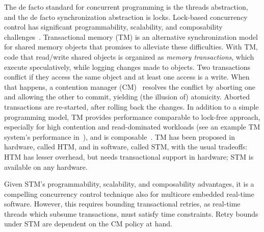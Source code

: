 \documentclass[conference]{IEEEtran}
\begin{document}
The de facto standard for concurrent programming is the threads abstraction, and the 
de facto synchronization abstraction is locks. Lock-based concurrency control has significant programmability, scalability, and composability challenges~\cite{Herlihy:2006:AMP:1146381.1146382}.
 Transactional memory (TM) is an alternative synchronization model for shared memory objects that promises to alleviate these difficulties. With TM, code that read/write shared objects is organized as \textit{memory transactions}, which execute speculatively, while logging changes made to objects. Two transactions conflict if they access the same object and at least one access is a write. When that happens, a contention manager (CM)~\cite{Guerraoui:2005:TTT:1073814.1073863} resolves the conflict by aborting one and allowing the other to commit, yielding (the illusion of) atomicity. Aborted transactions are re-started, after rolling back the changes. In addition to a simple programming model, TM provides performance comparable to lock-free approach, especially for high contention and read-dominated workloads (see an example TM system's performance in~\cite{Saha:2006:MHP:1122971.1123001}), and is composable~\cite{Harris:2005:CMT:1065944.1065952}. TM has been proposed in hardware, called HTM, and in software, called STM, with the usual tradeoffs: HTM has lesser overhead, but needs transactional support in hardware; STM is available on any hardware.

Given STM's programmability, scalability, and composability advantages, it is a compelling concurrency control technique also for multicore embedded real-time software. However, this requires  bounding transactional  retries, as real-time threads which subsume transactions, must satisfy time constraints.  Retry bounds under STM are dependent on the CM policy at hand. 
\end{document}
